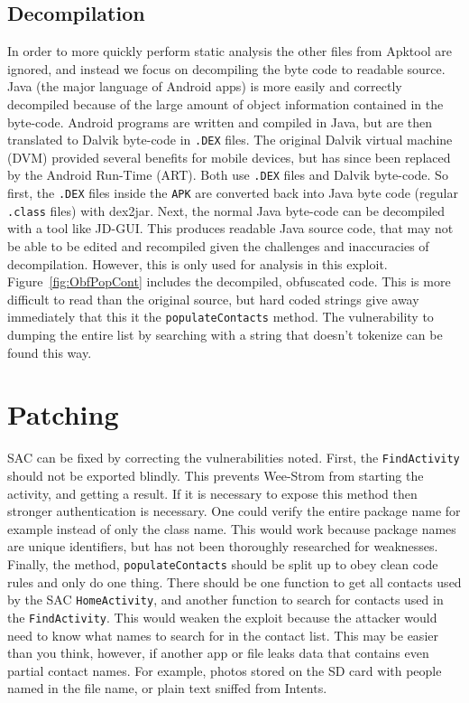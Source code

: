 \documentclass[conference,compsoc]{IEEEtran}
\begin{document}
\subsection{Decompilation}
In order to more quickly perform static analysis the other files from Apktool are ignored, and instead we focus on decompiling the byte code to readable source. Java (the major language of Android apps) is more easily and correctly decompiled because of the large amount of object information contained in the byte-code\cite{Miecznikowski:2002:DJB:647478.727938}.
\newline
\indent Android programs are written and compiled in Java, but are then translated to Dalvik byte-code in \texttt{.DEX} files. The original Dalvik virtual machine (DVM) provided several benefits for mobile devices, but has since been replaced by the Android Run-Time (ART). Both use \texttt{.DEX} files and Dalvik byte-code\cite{ARTDVM}. So first, the \texttt{.DEX} files inside the \texttt{APK} are converted back into Java byte code (regular \texttt{.class} files) with dex2jar\cite{dex2jar}.
\newline
\indent Next, the normal Java byte-code can be decompiled with a tool like JD-GUI\cite{jdgui}. This produces readable Java source code, that may not be able to be edited and recompiled given the challenges and inaccuracies of decompilation\cite{Miecznikowski:2002:DJB:647478.727938}. However, this is only used for analysis in this exploit. Figure~\ref{fig:ObfPopCont} includes the decompiled, obfuscated code. This is more difficult to read than the original source, but hard coded strings give away immediately that this it the \texttt{populateContacts} method. The vulnerability to dumping the entire list by searching with a string that doesn't tokenize can be found this way.

\section{Patching}
SAC can be fixed by correcting the vulnerabilities noted. First, the \texttt{FindActivity} should not be exported blindly. This prevents Wee-Strom from starting the activity, and getting a result. If it is necessary to expose this method then stronger authentication is necessary. One could verify the entire package name for example instead of only the class name. This would work because package names are unique identifiers\cite{Google:PackageName}, but has not been thoroughly researched for weaknesses.
\newline
\indent Finally, the method, \texttt{populateContacts} should be split up to obey clean code rules and only do one thing\cite{Martin:2008:CCH:1388398}. There should be one function to get all contacts used by the SAC \texttt{HomeActivity}, and another function to search for contacts used in the \texttt{FindActivity}. This would weaken the exploit because the attacker would need to know what names to search for in the contact list. This may be easier than you think, however, if another app or file leaks data that contains even partial contact names. For example, photos stored on the SD card with people named in the file name, or plain text sniffed from Intents.
\end{document}
